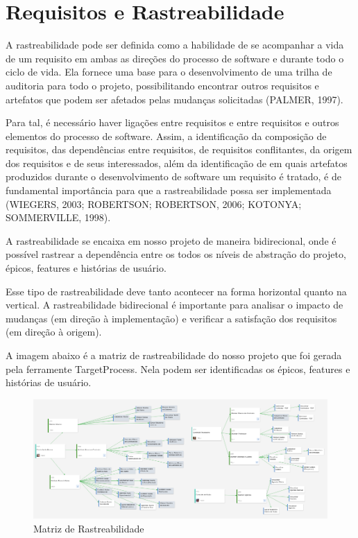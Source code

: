 \section[Requisitos e Rastreabilidade]{Requisitos e Rastreabilidade}
A rastreabilidade pode ser definida como a habilidade de se acompanhar a vida
de um requisito em ambas as direções do processo de software e durante todo o ciclo de
vida. Ela fornece uma base para o desenvolvimento de uma trilha de auditoria para todo
o projeto, possibilitando encontrar outros requisitos e artefatos que podem ser afetados
pelas mudanças solicitadas (PALMER, 1997). 

Para tal, é necessário haver ligações entre requisitos e entre requisitos e outros elementos do processo de software. Assim, a identificação da composição de requisitos, das dependências entre requisitos, de
requisitos conflitantes, da origem dos requisitos e de seus interessados, além da
identificação de em quais artefatos produzidos durante o desenvolvimento de software
um requisito é tratado, é de fundamental importância para que a rastreabilidade possa
ser implementada (WIEGERS, 2003; ROBERTSON; ROBERTSON, 2006;
KOTONYA; SOMMERVILLE, 1998). 

A rastreabilidade se encaixa em nosso projeto de maneira bidirecional, onde é
possível rastrear a dependência entre os todos os níveis de abstração do projeto,
épicos, features e histórias de usuário.

Esse tipo de rastreabilidade deve tanto acontecer na forma horizontal quanto
na vertical. A rastreabilidade bidirecional é importante para analisar o impacto
de mudanças (em direção à implementação) e verificar a satisfação dos
requisitos (em direção à origem).

A imagem abaixo é a matriz de rastreabilidade do nosso projeto que foi gerada pela ferramente TargetProcess. Nela podem ser identificadas os épicos, features e histórias de usuário.

\begin{figure}[!htb]
    \centering
    \includegraphics[width=1.5\textwidth, angle=-90]{figuras/matriz_rastreabilidade.png}
    \caption{Matriz de Rastreabilidade}
    \label{fig:matriz_rastreabilidade}
\end{figure}

